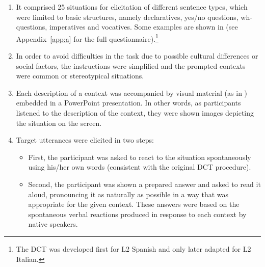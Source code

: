 \begin{enumerate}[label={(\arabic*)}]
\item
          It comprised 25 situations for elicitation of different sentence types, which were limited to basic structures, namely declaratives, yes/no questions, wh-questions, imperatives and vocatives. Some examples are shown in  (see Appendix~\ref{app:a} for the full questionnaire).\footnote{The DCT was developed first for L2 Spanish and only later adapted for L2 Italian.}



\item
          In order to avoid difficulties in the task due to possible cultural differences or social factors, the instructions were simplified and the prompted contexts were common or stereotypical situations.



\item
          Each description of a context was accompanied by visual material (as in \citealt{GabrielEtAl2010}) embedded in a PowerPoint presentation. In other words, as participants listened to the description of the context, they were shown images depicting the situation on the screen.



\item\label{it:3:4}
          Target utterances were elicited in two steps:


\begin{itemize}\sloppy
\item First, the participant was asked to react to the situation spontaneously using his/her own words (consistent with the original DCT procedure).

\item Second, the participant was shown a prepared answer and asked to read it aloud, pronouncing it as naturally as possible in a way that was appropriate for the given context. These answers were based on the spontaneous verbal reactions produced in response to each context by native speakers.

\end{itemize}
\end{enumerate}

